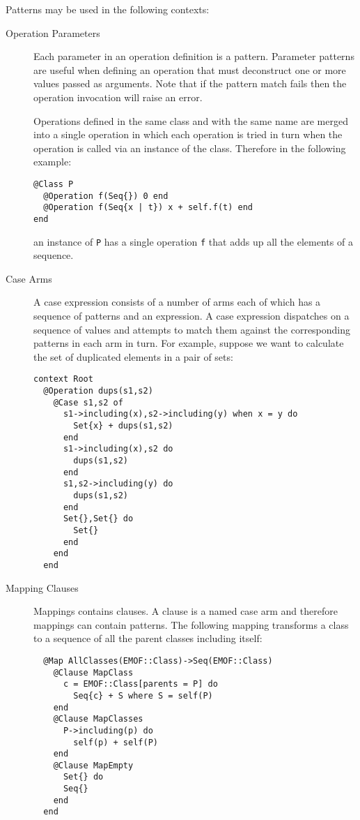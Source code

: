 \documentclass{article}
\begin{document}
Patterns may be used in the following contexts:

\begin{description}

\item[Operation Parameters]
Each parameter in an operation definition is a pattern. Parameter patterns
are useful when defining an operation that must deconstruct one or more values
passed as arguments. Note that if the pattern match fails then the operation
invocation will raise an error.

Operations defined in the same class and with the same name are merged into a 
single operation in which each operation is tried in turn when the operation
is called via an instance of the class. Therefore in the following example:
\begin{verbatim}
@Class P
  @Operation f(Seq{}) 0 end
  @Operation f(Seq{x | t}) x + self.f(t) end
end
\end{verbatim}
an instance of {\tt P} has a single operation {\tt f} that adds up all the 
elements of a sequence.

\item[Case Arms]
A case expression consists of a number of arms each of which has a sequence
of patterns and an expression. A case expression dispatches on a sequence of
values and attempts to match them against the corresponding patterns in each
arm in turn. For example, suppose we want to calculate the set of duplicated
elements in a pair of sets:
\begin{verbatim}
context Root
  @Operation dups(s1,s2)
    @Case s1,s2 of
      s1->including(x),s2->including(y) when x = y do 
        Set{x} + dups(s1,s2) 
      end
      s1->including(x),s2 do 
        dups(s1,s2) 
      end
      s1,s2->including(y) do 
        dups(s1,s2) 
      end
      Set{},Set{} do 
        Set{} 
      end
    end
  end
\end{verbatim}

\item[Mapping Clauses]
Mappings contains clauses. A clause is a named case arm and therefore mappings
can contain patterns. The following mapping transforms a class to a sequence
of all the parent classes including itself:
\begin{verbatim}
  @Map AllClasses(EMOF::Class)->Seq(EMOF::Class)
    @Clause MapClass
      c = EMOF::Class[parents = P] do 
        Seq{c} + S where S = self(P) 
    end
    @Clause MapClasses
      P->including(p) do 
        self(p) + self(P) 
    end
    @Clause MapEmpty
      Set{} do 
      Seq{}
    end
  end
\end{verbatim}

\end{description}
\end{document}
